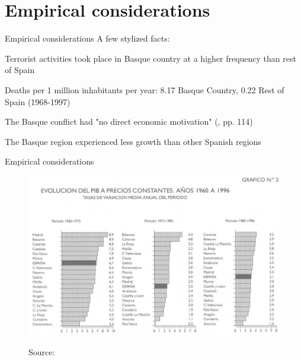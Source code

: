 \documentclass[notes,11pt, aspectratio=169]{beamer}
\newenvironment{wideitemize}{\itemize\addtolength{\itemsep}{10pt}}{\enditemize}
\begin{document}
\section{Empirical considerations}

\begin{frame}{Empirical considerations}
    A few stylized facts: \medskip 
    \begin{wideitemize}
        \item Terrorist activities took place in Basque country at a higher frequency than rest of Spain \medskip 
        \begin{wideitemize}
            \item Deaths per 1 million inhabitants per year: 8.17 Basque Country, 0.22 Rest of Spain (1968-1997) \pause
        \end{wideitemize}
        \item The Basque conflict had "no direct economic motivation" (\cite{abadie_economic_2003}, pp. 114) \pause 
        \item The Basque region experienced less growth than other Spanish regions
    \end{wideitemize}
\end{frame}

\begin{frame}{Empirical considerations}
    \begin{figure}
    \centering
        \includegraphics[width = .75\linewidth]{figures/evolucion_pib.png}
        \label{fig:evolucion}
        \caption*{\small Source: \cite{fundacion_bbv_renta_1999}}
    \end{figure}
\end{frame}
\end{document}
